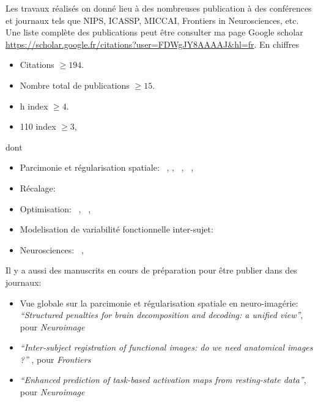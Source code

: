 Les travaux réalisés on donné lieu à des nombreuses publication à des conférences et journaux tels que NIPS, ICASSP, MICCAI, Frontiers in Neurosciences, etc.
Une liste complète des publications peut être consulter ma page Google scholar \url{https://scholar.google.fr/citations?user=FDWgJY8AAAAJ&hl=fr}. En chiffres
\begin{shaded}
\begin{itemize}
\item Citations $\ge 194$.
  \item Nombre total de publications $\ge 15$.
  \item h index $\ge 4$.
  \item 110 index $ \ge 3$,
  \end{itemize}
\end{shaded}
\begin{shaded}
  dont
\begin{itemize}
  \item{Parcimonie et régularisation spatiale:}
     ~\citep{dohmatob2014benchmarking},  \citep{dohmatob2015speeding},
     ~\citep{abrahamregion},  ~\citep{eickenberg2015total},
     ~\citep{pelle2016multivariate}
  \item{Récalage:}
    ~\citep{dohmatob2016epi2epi}
  \item{Optimisation:}
     ~\citep{dohmatob2015local},  ~\citep{varoquaux2015faasta},  ~\citep{dohmatob2015simple}
  \item Modelisation de variabilité fonctionnelle inter-sujet:
     ~\citep{dohmatob2016}
  \item{Neurosciences:}
     ~\citep{rahim2015integrating},  ~\citep{thirion2014fmri}
\end{itemize}
\end{shaded}

Il y a aussi des manuscrits en cours de préparation pour être publier dans des journaux:

\begin{shaded}
\begin{itemize}
  \item Vue globale sur la parcimonie et régularisation spatiale en neuro-imagérie:
    \textit{``Structured penalties for brain decomposition and decoding: a unified view''},
    pour \textit{Neuroimage}
    
   \item \textit{``Inter-subject registration of functional images: do we need anatomical images ?''} , pour \textit{Frontiers}
   \item \textit{``Enhanced prediction of task-based activation maps from resting-state data''}, pour \textit{Neuroimage}
\end{itemize}
\end{shaded}



